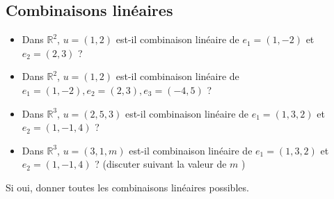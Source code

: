 

\subsection{Combinaisons linéaires}

\begin{itemize}
    \item Dans $\mathbb{R}^2$, $u=(1,2)$ est-il combinaison linéaire de $e_1=(1,-2)$ et $e_2=(2,3)$ ?
    \item Dans $\mathbb{R}^2$, $u=(1,2)$ est-il combinaison linéaire de $e_1=(1,-2), e_2=(2,3), e_3=(-4,5)$ ?
    \item Dans $\mathbb{R}^3$, $u=(2,5,3)$ est-il combinaison linéaire de $e_1=(1,3,2)$ et $e_2=(1,-1,4)$ ?
    \item Dans $\mathbb{R}^3$, $u=(3,1, m)$ est-il combinaison linéaire de $e_1=(1,3,2)$ et $e_2=(1,-1,4)$ ? \newline 
    (discuter suivant la valeur de $m$ ) 
\end{itemize}
Si oui, donner toutes les combinaisons linéaires possibles.

